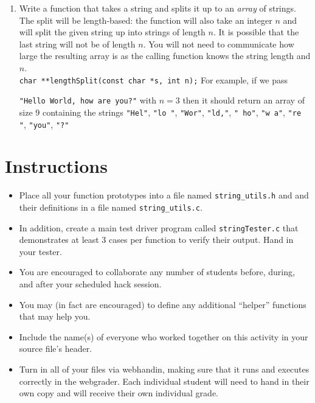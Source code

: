 \documentclass[12pt]{scrartcl}
\begin{document}
\begin{enumerate}
  \item Write a function that takes a string and splits it up to an 
  \emph{array} of strings.  The split will be length-based: the function 
  will also take an integer $n$ and will split the given string up into 
  strings of length $n$.  It is possible that the last string will not 
  be of length $n$.  You will not need to communicate how large the 
  resulting array is as the calling function knows the string length 
  and $n$.\\
  \texttt{char **lengthSplit(const char *s, int n);}
  For example, if we pass 
  
  \texttt{"Hello World, how are you?"} with $n = 3$ then it 
  should return an array of size 9 containing the strings \texttt{"Hel"}, \texttt{"lo "}, \texttt{"Wor"}, 
\texttt{"ld,"}, \texttt{" ho"}, \texttt{"w a"}, \texttt{"re "}, \texttt{"you"}, \texttt{"?"}

\end{enumerate}

\section*{Instructions}

\begin{itemize}

  \item Place all your function prototypes into a file 
  named \texttt{string_utils.h} and and their definitions in a
  file named \texttt{string_utils.c}.  
  
  \item In addition, create a main test driver program called
  \texttt{stringTester.c} that demonstrates at least 3 cases 
  per function to verify their output.  Hand in your tester.
  
  \item You are encouraged to collaborate any number of students 
  before, during, and after your scheduled hack session.  

  \item You may (in fact are encouraged) to define any additional
  ``helper'' functions that may help you.
  
  \item Include the name(s) of everyone who worked together on
  this activity in your source file's header.

  \item Turn in all of your files via webhandin, making sure that 
  it runs and executes correctly in the webgrader.  Each individual 
  student will need to hand in their own copy and will receive 
  their own individual grade.

\end{itemize}  
\end{document}
